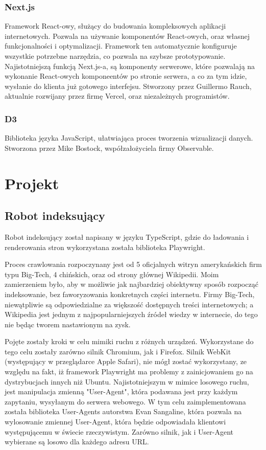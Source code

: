 \documentclass[a4paper, 12pt]{article}
\begin{document}
\subsubsection{Next.js}
Framework React-owy, służący do budowania kompleksowych aplikacji internetowych. Pozwala na używanie komponentów React-owych, oraz własnej funkcjonalności i optymalizacji. Framework ten automatycznie konfiguruje wszystkie potrzebne narzędzia, co pozwala na szybsze prototypowanie. Najistotniejszą funkcją Next.js-a, są komponenty serwerowe, które pozwalają na wykonanie React-owych komponeentów po stronie serwera, a co za tym idzie, wysłanie do klienta już gotowego interfejsu.\cite{introNextjs} Stworzony przez Guillermo Rauch\cite{githubNextjsInit}, aktualnie rozwijany przez firmę Vercel, oraz niezależnych programistów.\cite{githubNextjsContributors}
\subsubsection{D3}
Biblioteka języka JavaScript, ułatwiająca proces tworzenia wizualizacji danych.\cite{homeD3} Stworzona przez Mike Bostock, współzałożyciela firmy Observable.\cite{githubD3Init}

\section{Projekt}
\subsection{Robot indeksujący}
Robot indeksujący został napisany w języku TypeScript, gdzie do ładowania i renderowania stron wykorzystana została biblioteka Playwright.

Proces crawlowania rozpoczynany jest od 5 oficjalnych witryn amerykańskich firm typu Big-Tech, 4 chińskich, oraz od strony głównej Wikipedii. Moim zamierzeniem było, aby w możliwie jak najbardziej obiektywny sposób rozpocząć indeksowanie, bez faworyzowania konkretnych części internetu. Firmy Big-Tech, niewątpliwie są odpowiedzialne za większość dostępnych treści internetowych; a Wikipedia jest jednym z najpopularniejszych źródeł wiedzy w internecie, do tego nie będąc tworem nastawionym na zysk.

Pojęte zostały kroki w celu mimiki ruchu z różnych urządzeń. Wykorzystane do tego celu zostały zarówno silnik Chromium, jak i Firefox. Silnik WebKit (występujący w przeglądarce Apple Safari), nie mógł zostać wykorzystany, ze względu na fakt, iż framework Playwright ma problemy z zainicjowaniem go na dystrybucjach innych niż Ubuntu.\cite{playwrightWebkitIssue} Najistotniejszym w mimice losowego ruchu, jest manipulacja zmienną "User-Agent", która podawana jest przy każdym zapytaniu, wysyłanym do serwera webowego. W tym celu zaimplementowana została biblioteka User-Agents autorstwa Evan Sangaline, która pozwala na wylosowanie zmiennej User-Agent, która będzie odpowiadała klientowi występującemu w świecie rzeczywistym. Zarówno silnik, jak i User-Agent wybierane są losowo dla każdego adresu URL.
\end{document}
